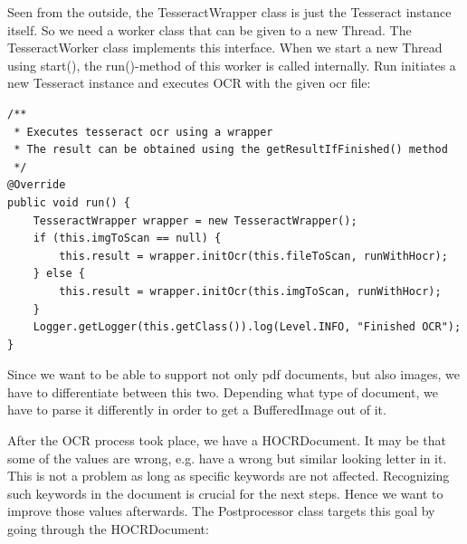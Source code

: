 Seen from the outside, the TesseractWrapper class is just the Tesseract instance itself. So we need a worker class that can be given to a new Thread. The TesseractWorker class implements this interface. When we start a new Thread using start(), the run()-method of this worker is called internally. Run initiates a new Tesseract instance and executes OCR with the given ocr file: 

\begin{lstlisting}[caption={Initiation of the OCR wrapper}]
/**
 * Executes tesseract ocr using a wrapper
 * The result can be obtained using the getResultIfFinished() method
 */
@Override
public void run() {
    TesseractWrapper wrapper = new TesseractWrapper();
    if (this.imgToScan == null) {
        this.result = wrapper.initOcr(this.fileToScan, runWithHocr);
    } else {
        this.result = wrapper.initOcr(this.imgToScan, runWithHocr);
    }
    Logger.getLogger(this.getClass()).log(Level.INFO, "Finished OCR");
}
\end{lstlisting}

Since we want to be able to support not only pdf documents, but also images, we have to differentiate between this two. Depending what type of document, we have to parse it differently in order to get a BufferedImage out of it.

After the OCR process took place, we have a HOCRDocument. It may be that some of the values are wrong, e.g. have a wrong but similar looking letter in it. This is not a problem as long as specific keywords are not affected. Recognizing such keywords in the document is crucial for the next steps. Hence we want to improve those values afterwards. 
The Postprocessor class targets this goal by going through the HOCRDocument:

